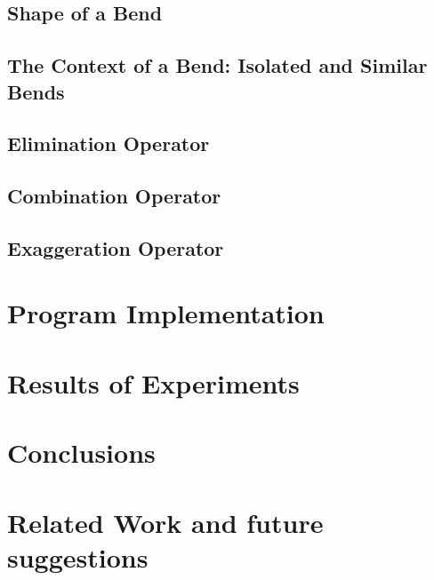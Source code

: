 \documentclass[a4paper]{article}
\begin{document}
\subsection{Shape of a Bend}

\subsection{The Context of a Bend: Isolated and Similar Bends}

\subsection{Elimination Operator}

\subsection{Combination Operator}

\subsection{Exaggeration Operator}

\section{Program Implementation}

\section{Results of Experiments}

\section{Conclusions}
\label{sec:conclusions}

\section{Related Work and future suggestions}
\label{sec:related_work}

\printbibliography
\end{document}
